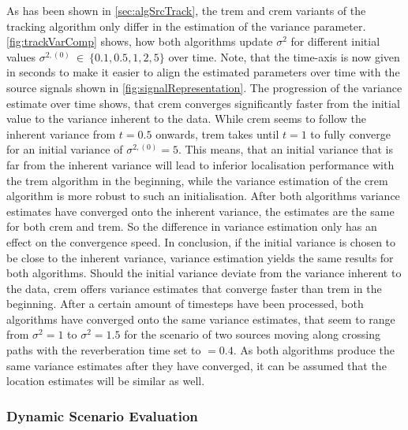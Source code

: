 As has been shown in \autoref{sec:algSrcTrack}, the \gls{trem} and \gls{crem} variants of the tracking algorithm only differ in the estimation of the variance parameter. \autoref{fig:trackVarComp} shows, how both algorithms update $\sigma^2$ for different initial values $\sigma^{2,(0)}\ \in\ \{0.1, 0.5, 1, 2, 5\}$ over time. Note, that the time-axis is now given in seconds to make it easier to align the estimated parameters over time with the source signals shown in \autoref{fig:signalRepresentation}. The progression of the variance estimate over time shows, that \gls{crem} converges significantly faster from the initial value to the variance inherent to the data. While \gls{crem} seems to follow the inherent variance from $t=0.5$ onwards, \gls{trem} takes until $t=1$ to fully converge for an initial variance of $\sigma^{2,(0)}=5$. This means, that an initial variance that is far from the inherent variance will lead to inferior localisation performance with the \gls{trem} algorithm in the beginning, while the variance estimation of the \gls{crem} algorithm is more robust to such an initialisation. After both algorithms variance estimates have converged onto the inherent variance, the estimates are the same for both \gls{crem} and \gls{trem}. So the difference in variance estimation only has an effect on the convergence speed. In conclusion, if the initial variance is chosen to be close to the inherent variance, variance estimation yields the same results for both algorithms. Should the initial variance deviate from the variance inherent to the data, \gls{crem} offers variance estimates that converge faster than \gls{trem} in the beginning. After a certain amount of timesteps have been processed, both algorithms have converged onto the same variance estimates, that seem to range from $\sigma^2=1$ to $\sigma^2=1.5$ for the scenario of two sources moving along crossing paths with the reverberation time set to \Tsixty$=0.4$. As both algorithms produce the same variance estimates after they have converged, it can be assumed that the location estimates will be similar as well.

\setlength{\figureheight}{4cm}
\newcommand{\trajOpacity}{0.2}
\newcommand{\trajSize}{2pt}
\newcommand{\trajLinewidth}{0.5pt}
\newcommand{\estOpacity}{0.2}
\newcommand{\estSize}{4pt}
\newcommand{\estLinewidth}{0.5pt}
\newcommand{\trajDashedLinewidth}{2pt}

\subsubsection{Dynamic Scenario Evaluation}

